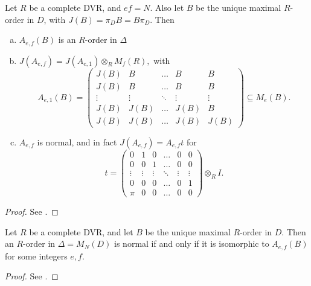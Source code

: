 \begin{lem}\mbox{}
Let $R$ be a complete DVR, and $ef=N$.  Also let $B$ be the unique maximal $R$-order in $D$, with $J(B) = \pi_DB =B\pi_D$.  Then
\begin{enumerate}[(a)]
\item  $A_{e,f}(B)$ is an $R$-order in $\Delta$
\item  $J(A_{e,f}) = J(A_{e,1})\otimes_R M_{f}(R),$ with
$$A_{e,1}(B)= \left(\begin{array}{ccccc}
J(B)   &  B     & \dots  & B      & B\\
J(B)   &  B     & \dots  & B      & B\\
\vdots & \vdots & \ddots & \vdots & \vdots\\
J(B)   & J(B)   & \dots  & J(B)   & B\\
J(B)   & J(B)   & \dots  & J(B)   & J(B)
\end{array}\right)\subseteq M_e(B).$$
\item  $A_{e,f}$ is normal, and in fact $J(A_{e,f}) = A_{e,f}t$ for
$$t = \left(\begin{array}{cccccc}
0      &  1     & 0      & \dots  &  0     & 0\\
0      &  0     & 1      & \dots  &  0     & 0\\
\vdots & \vdots & \vdots & \ddots & \vdots & \vdots\\
0      &  0     & 0      & \dots  &  0     & 1\\
\pi    &  0     & 0      & \dots  &  0     & 0
\end{array}\right)\otimes_R I.$$
\end{enumerate}
\end{lem}
\begin{proof}
See \cite{Artin&deJong}.
\end{proof}

\begin{thm}
Let $R$ be a complete DVR, and let $B$ be the unique maximal $R$-order in $D$.  Then an $R$-order in $\Delta = M_N(D)$ is normal if and only if it is isomorphic to $A_{e,f}(B)$ for some integers $e,f$.
\end{thm}
\begin{proof}
See \cite{Artin&deJong}.
\end{proof}

